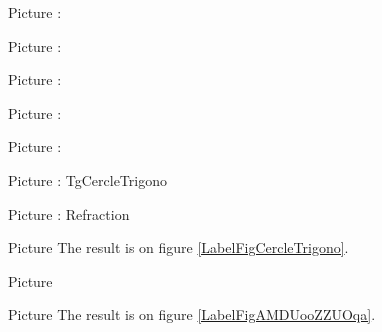 Picture : 
\begin{center}
   
\end{center}

\clearpage

\huge
Picture : 
\begin{center}
   
\end{center}
\normalsize


Picture : 
\begin{center}
   
\end{center}


Picture : 
\begin{center}
   
\end{center}


Picture : 
\begin{center}
   
\end{center}


Picture : TgCercleTrigono
\begin{center}
   
\end{center}

Picture : Refraction
\begin{center}
   
\end{center}

Picture 
The result is on figure \ref{LabelFigCercleTrigono}. %
\newcommand{\CaptionFigCercleTrigono}{<+Type your caption here+>}


Picture 
\begin{center}
   
\end{center}

Picture 
The result is on figure \ref{LabelFigAMDUooZZUOqa}. %
\newcommand{\CaptionFigAMDUooZZUOqa}{<+Type your caption here+>}




